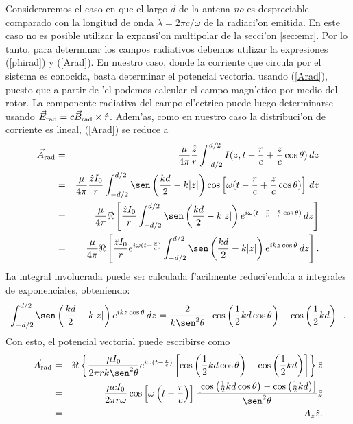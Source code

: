 Consideraremos el caso en que el largo $d$ de la antena \textit{no} es despreciable comparado con la longitud de onda $\lambda=2\pi c/\omega$ de la radiaci'on emitida. En este caso no es posible utilizar la expansi'on multipolar de la secci'on \ref{sec:emr}. Por lo tanto, para determinar los campos radiativos debemos utilizar la expresiones  (\ref{phirad}) y (\ref{Arad}). En nuestro caso, donde la corriente que circula por el sistema es conocida, basta determinar el potencial vectorial usando (\ref{Arad}), puesto que a partir de 'el podemos calcular el campo magn'etico por medio del rotor. La componente radiativa del campo el'ectrico puede luego determinarse usando $\vec{E}_{\rm rad}=c\vec{B}_{\rm rad}\times\hat{r}$. Adem'as, como en nuestro caso la distribuci'on de corriente es lineal, (\ref{Arad}) se reduce a
\begin{eqnarray}
 \vec{A}_{\rm rad}&=&\frac{\mu}{4\pi}\frac{\hat{z}}{r}\int_{-d/2}^{d/2}I(z,t-\frac{r}{c}+\frac{z}{c}\cos\theta)\,dz \\
&=&\frac{\mu}{4\pi}\frac{\hat{z}I_0}{r}\int_{-d/2}^{d/2}\sen\left(\frac{kd}{2}-k|z|\right)\cos\left[\omega (t-\frac{r}{c}+\frac{z}{c}\cos\theta)\right]\,dz \\
&=&\frac{\mu}{4\pi}\Re\left[\frac{\hat{z}I_0}{r}\int_{-d/2}^{d/2}\sen\left(\frac{kd}{2}-k|z|\right)e^{i\omega (t-\frac{r}{c}+\frac{z}{c}\cos\theta)}\,dz \right]\\
&=&\frac{\mu}{4\pi}\Re\left[\frac{\hat{z}I_0}{r}e^{i\omega(t-\frac{r}{c})}\int_{-d/2}^{d/2}\sen\left(\frac{kd}{2}-k|z|\right)e^{ikz\cos\theta}\,dz \right] .
\end{eqnarray}
La integral involucrada puede ser calculada f'acilmente reduci'endola a integrales de exponenciales, obteniendo:
\begin{equation}
 \int_{-d/2}^{d/2}\sen\left(\frac{kd}{2}-k|z|\right)e^{ikz\cos\theta}\,dz=\frac{2}{k\sen^2\theta}\left[\cos\left(\frac{1}{2}kd\cos\theta\right)-\cos\left(\frac{1}{2}kd\right)\right] .
\end{equation}
Con esto, el potencial vectorial puede escribirse como
\begin{eqnarray}
 \vec{A}_{\rm rad}&=&
\Re\left\lbrace\frac{\mu I_0}{2\pi rk\sen^2\theta}e^{i\omega(t-\frac{r}{c})}\left[\cos\left(\frac{1}{2}kd\cos\theta\right)-\cos\left(\frac{1}{2}kd\right)\right] \right\rbrace\hat{z}\\
&=&\frac{\mu cI_0}{2\pi r\omega}\cos\left[\omega\left(t-\frac{r}{c}\right)\right]\frac{\left[\cos\left(\frac{1}{2}kd\cos\theta\right)-\cos\left(\frac{1}{2}kd\right)\right]}{\sen^2\theta}\hat{z} \\
&=&A_z\hat{z}.
\end{eqnarray}
